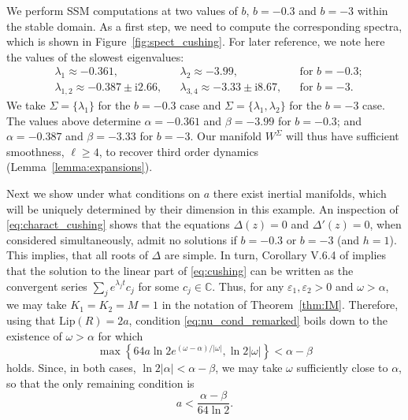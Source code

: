 \documentclass[a4paper, 12pt, oneside, reqno, notitlepage]{amsart}
\theoremstyle{plain}
\theoremstyle{definition}
\theoremstyle{remark}
\newcommand{\lip}{\mathrm{Lip}}
\begin{document}
We perform SSM computations at two values of $b$, $b = -0.3$ and $b = -3$ within the stable domain.
As a first step, we need to compute the corresponding spectra, which is shown in Figure~\ref{fig:spect_cushing}.
For later reference, we note here the values of the slowest eigenvalues:
\begin{align*}
     &\lambda_1 \approx -0.361, & &\lambda_2 \approx -3.99, &  &\text{for }b = -0.3;  \\
    &\lambda_{1,2} \approx -0.387 \pm \mathrm{i} 2.66, & &\lambda_{3,4} \approx -3.33 \pm \mathrm{i} 8.67 , & &\text{for }b = -3.
\end{align*}
We take $\Sigma = \{ \lambda_1\}$ for the $b = -0.3$ case and $\Sigma = \{\lambda_1,\lambda_2\}$ for the $b = -3$ case.
The values above determine $\alpha = -0.361$ and $\beta = -3.99$ for $b = -0.3$; and $\alpha = -0.387$ and $\beta = -3.33$ for $b = -3$.
Our manifold $W^\Sigma$ will thus have sufficient smoothness, $\ell \geq 4$, to recover third order dynamics (Lemma~\ref{lemma:expansions}).



Next we show under what conditions on $a$ there exist inertial manifolds, which will be uniquely determined by their dimension in this example.
An inspection of \eqref{eq:charact_cushing} shows that the equations $\Delta(z) =0$ and $\Delta'(z) = 0$, when considered simultaneously, admit no solutions if $b = -0.3$ or $b = -3$ (and $h = 1$). 
This implies, that all roots of $\Delta$ are simple. 
In turn,
Corollary V.6.4 of \cite{diekmann2012delay} implies that the solution to the linear part of \eqref{eq:cushing} can be written as the convergent series 
$\sum_j e^{\lambda_j t} c_j$ for some $c_j \in \mathbb{C}$.
Thus, for any $\varepsilon_1,\varepsilon_2 > 0$ and $\omega > \alpha$, we may take $K_1 = K_2 = M = 1$ in the notation of Theorem~\ref{thm:IM}.
Therefore, using that $\lip(R)  = 2a$, condition \eqref{eq:nu_cond_remarked} boils down to the existence of $\omega >  \alpha$ for which
\begin{displaymath}
    \max \left\{ 64a \ln 2 e^{(\omega - \alpha)/|\omega|}, \ln 2 |\omega| \right\} < \alpha - \beta
\end{displaymath}
holds.
Since, in both cases, $\ln 2|\alpha| < \alpha - \beta$, we may take $\omega$  sufficiently close to $\alpha$, so that the only remaining condition is
\begin{displaymath}
    a < \frac{\alpha - \beta}{64 \ln 2}.
\end{displaymath} 
\end{document}
